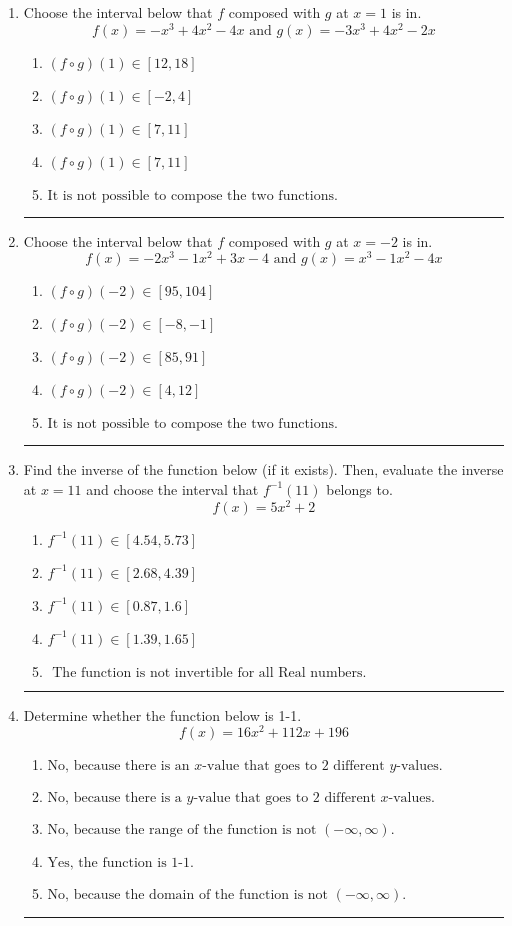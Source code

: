 \documentclass[14pt]{extbook}
\newcommand{\litem}[1]{\item#1\hspace*{-1cm}\rule{\textwidth}{0.4pt}}
\begin{document}
\begin{enumerate}
{\begin{enumerate}[label=\Alph*.]
\end{enumerate} }
\litem{
Choose the interval below that $f$ composed with $g$ at $x=1$ is in.\[ f(x) = -x^{3} +4 x^{2} -4 x \text{ and } g(x) = -3x^{3} +4 x^{2} -2 x \]\begin{enumerate}[label=\Alph*.]
\item \( (f \circ g)(1) \in [12, 18] \)
\item \( (f \circ g)(1) \in [-2, 4] \)
\item \( (f \circ g)(1) \in [7, 11] \)
\item \( (f \circ g)(1) \in [7, 11] \)
\item \( \text{It is not possible to compose the two functions.} \)

\end{enumerate} }
\litem{
Choose the interval below that $f$ composed with $g$ at $x=-2$ is in.\[ f(x) = -2x^{3} -1 x^{2} +3 x -4 \text{ and } g(x) = x^{3} -1 x^{2} -4 x \]\begin{enumerate}[label=\Alph*.]
\item \( (f \circ g)(-2) \in [95, 104] \)
\item \( (f \circ g)(-2) \in [-8, -1] \)
\item \( (f \circ g)(-2) \in [85, 91] \)
\item \( (f \circ g)(-2) \in [4, 12] \)
\item \( \text{It is not possible to compose the two functions.} \)

\end{enumerate} }
\litem{
Find the inverse of the function below (if it exists). Then, evaluate the inverse at $x = 11$ and choose the interval that $f^{-1}(11)$ belongs to.\[ f(x) = 5 x^2 + 2 \]\begin{enumerate}[label=\Alph*.]
\item \( f^{-1}(11) \in [4.54, 5.73] \)
\item \( f^{-1}(11) \in [2.68, 4.39] \)
\item \( f^{-1}(11) \in [0.87, 1.6] \)
\item \( f^{-1}(11) \in [1.39, 1.65] \)
\item \( \text{ The function is not invertible for all Real numbers. } \)

\end{enumerate} }
\litem{
Determine whether the function below is 1-1.\[ f(x) = 16 x^2 + 112 x + 196 \]\begin{enumerate}[label=\Alph*.]
\item \( \text{No, because there is an $x$-value that goes to 2 different $y$-values.} \)
\item \( \text{No, because there is a $y$-value that goes to 2 different $x$-values.} \)
\item \( \text{No, because the range of the function is not $(-\infty, \infty)$.} \)
\item \( \text{Yes, the function is 1-1.} \)
\item \( \text{No, because the domain of the function is not $(-\infty, \infty)$.} \)


\end{enumerate}}
\end{enumerate}
\end{document}
